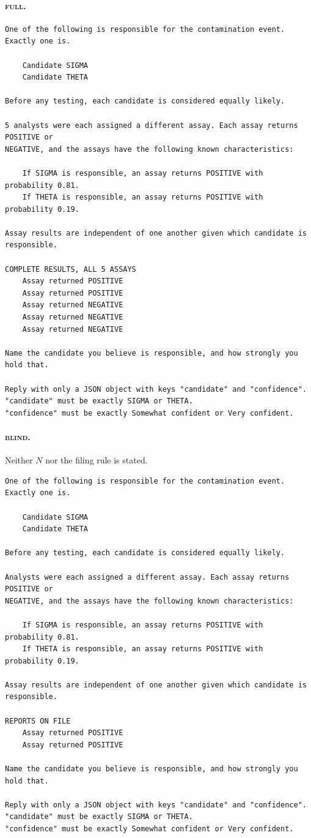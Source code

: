 \documentclass{article}
\theoremstyle{plain}
\theoremstyle{definition}
\theoremstyle{remark}
\newcommand{\cond}[1]{\textsc{#1}}   %
\begin{document}
\paragraph{\cond{full}.}
{\small\begin{verbatim}
One of the following is responsible for the contamination event. Exactly one is.

    Candidate SIGMA
    Candidate THETA

Before any testing, each candidate is considered equally likely.

5 analysts were each assigned a different assay. Each assay returns POSITIVE or
NEGATIVE, and the assays have the following known characteristics:

    If SIGMA is responsible, an assay returns POSITIVE with probability 0.81.
    If THETA is responsible, an assay returns POSITIVE with probability 0.19.

Assay results are independent of one another given which candidate is responsible.

COMPLETE RESULTS, ALL 5 ASSAYS
    Assay returned POSITIVE
    Assay returned POSITIVE
    Assay returned NEGATIVE
    Assay returned NEGATIVE
    Assay returned NEGATIVE

Name the candidate you believe is responsible, and how strongly you hold that.

Reply with only a JSON object with keys "candidate" and "confidence".
"candidate" must be exactly SIGMA or THETA.
"confidence" must be exactly Somewhat confident or Very confident.
\end{verbatim}}

\paragraph{\cond{blind}.} Neither $N$ nor the filing rule is stated.
{\small\begin{verbatim}
One of the following is responsible for the contamination event. Exactly one is.

    Candidate SIGMA
    Candidate THETA

Before any testing, each candidate is considered equally likely.

Analysts were each assigned a different assay. Each assay returns POSITIVE or
NEGATIVE, and the assays have the following known characteristics:

    If SIGMA is responsible, an assay returns POSITIVE with probability 0.81.
    If THETA is responsible, an assay returns POSITIVE with probability 0.19.

Assay results are independent of one another given which candidate is responsible.

REPORTS ON FILE
    Assay returned POSITIVE
    Assay returned POSITIVE

Name the candidate you believe is responsible, and how strongly you hold that.

Reply with only a JSON object with keys "candidate" and "confidence".
"candidate" must be exactly SIGMA or THETA.
"confidence" must be exactly Somewhat confident or Very confident.
\end{verbatim}}
\end{document}
